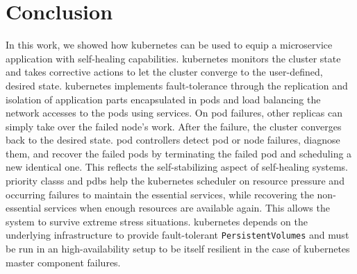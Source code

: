 
\section{Conclusion}\label{sec:conclusion}
  In this work, we showed how \gls{kubernetes} can be used to equip a microservice application with self-healing capabilities.
  \Gls{kubernetes} monitors the cluster state and takes corrective actions to let the cluster converge to the user-defined, desired state.
  \Gls{kubernetes} implements fault-tolerance through the replication and isolation of application parts encapsulated in pods and load balancing the network accesses to the pods using \glspl{service}.
  On pod failures, other replicas can simply take over the failed node's work.
  After the failure, the cluster converges back to the desired state.
  \Glspl{pod controller} detect pod or node failures, diagnose them, and recover the failed pods by terminating the failed pod and scheduling a new identical one.
  This reflects the self-stabilizing aspect of self-healing systems.
  \Glspl{priority class} and \glspl{pdb} help the \gls{kubernetes} scheduler on resource pressure and occurring failures to maintain the essential services, while recovering the non-essential services when enough resources are available again.
  This allows the system to survive extreme stress situations.
  \Gls{kubernetes} depends on the underlying infrastructure to provide fault-tolerant \texttt{PersistentVolumes} and must be run in an high-availability setup to be itself resilient in the case of \gls{kubernetes} master component failures.